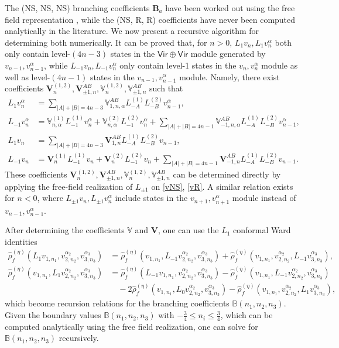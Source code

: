 \documentclass[12pt]{article}
\def\ie{\begin{equation}\begin{aligned}}
\def\fe{\end{aligned}\end{equation}}
\begin{document}
The (NS, NS, NS) branching coefficients $\mathbf{B}_a$ have been worked out using the free field representation \cite{Hadasz:2013dza}, while the (NS, R, R) coefficients have never been computed analytically in the literature. We now present a recursive algorithm for determining both numerically. It can be proved that, for $n> 0$, $L_1 v_n, L_{1}v_n^\alpha$ both only contain level-$(4n-3)$ states in the $\mathsf{Vir\oplus Vir}$ module generated by $v_{n-1}, v_{n-1}^\alpha$, while $L_{-1}v_n, L_{-1}v_n^\alpha$ only contain level-1 states in the $v_n, v_n^\alpha$ module as well as level-$(4n-1)$ states in the $v_{n-1}, v_{n-1}^\alpha$ module. Namely, there exist coefficients $\mathbf{V}_n^{(1,2)}, \mathbf{V}_{\pm 1, n}^{AB}, \mathbb{V}_n^{(1,2)}, \mathbb{V}_{\pm 1, n}^{AB}$ such that
\ie \label{Vcoeffs}
L_1 v_n^\alpha &= \sum_{|A|+|B|=4n-3} \mathbb{V}_{1,n,\alpha}^{AB} L_{-A}^{(1)}L_{-B}^{(2)} v_{n-1}^\alpha,\\
L_{-1} v_n^\alpha &= \mathbb{V}_{n,\alpha}^{(1)} L_{-1}^{(1)}v_n^\alpha + \mathbb{V}_{n,\alpha}^{(2)} L_{-1}^{(2)}v_n^\alpha + \sum_{|A|+|B|=4n-1} \mathbb{V}_{-1,n,\alpha}^{AB} L_{-A}^{(1)}L_{-B}^{(2)} v_{n-1}^\alpha,\\
L_1 v_n &= \sum_{|A|+|B|=4n-3} \mathbf{V}_{1,n}^{AB} L_{-A}^{(1)}L_{-B}^{(2)} v_{n-1},\\
L_{-1} v_n &= \mathbf{V}_{n}^{(1)} L_{-1}^{(1)}v_n + \mathbf{V}_{n}^{(2)} L_{-1}^{(2)}v_n  + \sum_{|A|+|B|=4n-1} \mathbf{V}_{-1,n}^{AB} L_{-A}^{(1)}L_{-B}^{(2)} v_{n-1}.
\fe
These coefficients $\mathbf{V}_n^{(1,2)}, \mathbf{V}_{\pm 1, n}^{AB}, \mathbb{V}_n^{(1,2)}, \mathbb{V}_{\pm 1, n}^{AB}$ can be determined directly by applying the free-field realization of $L_{\pm 1}$ on \eqref{vNS}, \eqref{vR}. A similar relation exists for $n< 0$, where $L_{\pm 1}v_n, L_{\pm 1}v_n^\alpha$ include states in the $v_{n+1}, v_{n+1}^\alpha$ module instead of $v_{n-1}, v_{n-1}^\alpha$.

After determining the coefficients $\mathbb{V}$ and $\mathbf{V}$, one can use the $L_1$ conformal Ward identities
\ie
\hat{\rho}_f^{(\eta)}(L_1v_{1,n_1},v_{2,n_2}^{\alpha_2},v_{3,n_3}^{\alpha_3})&= \hat{\rho}_f^{(\eta)}(v_{1,n_1},L_{-1}v_{2,n_2}^{\alpha_2},v_{3,n_3}^{\alpha_3})+\hat{\rho}_f^{(\eta)}(v_{1,n_1},v_{2,n_2}^{\alpha_2},L_{-1}v_{3,n_3}^{\alpha_3}),\\
\hat{\rho}_f^{(\eta)}(v_{1,n_1},L_1v_{2,n_2}^{\alpha_2},v_{3,n_3}^{\alpha_3})&= \hat{\rho}_f^{(\eta)}(L_{-1}v_{1,n_1},v_{2,n_2}^{\alpha_2},v_{3,n_3}^{\alpha_3})-\hat{\rho}_f^{(\eta)}(v_{1,n_1},L_{-1}v_{2,n_2}^{\alpha_2},v_{3,n_3}^{\alpha_3})\\
&\quad-2\hat{\rho}_f^{(\eta)}(v_{1,n_1},L_0v_{2,n_2}^{\alpha_2},v_{3,n_3}^{\alpha_3})-\hat{\rho}_f^{(\eta)}(v_{1,n_1},v_{2,n_2}^{\alpha_2},L_1v_{3,n_3}^{\alpha_3}),
\fe
which become recursion relations for the branching coefficients $\mathbb{B}(n_1, n_2, n_3)$. Given the boundary values $\mathbb{B}(n_1, n_2, n_3)$ with $-\frac{3}{4}\leq n_i \leq \frac{3}{4}$, which can be computed analytically using the free field realization, one can solve for $\mathbb{B}(n_1, n_2, n_3)$ recursively. 
\end{document}
